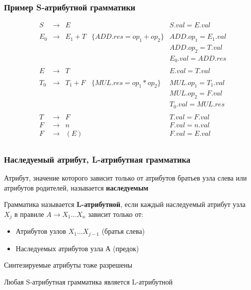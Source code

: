 \documentclass{beamer}
\begin{document}
\begin{frame}[fragile]
  \transwipe[direction=90]
  \frametitle{Пример S-атрибутной грамматики}
$$
\begin{array}{ccclll}
&S  & \rightarrow & E       &                                & S.val = E.val \\~\\

&E_0& \rightarrow & E_1 + T & \{ ADD.res = op_1 + op_2 \} & ADD.op_1 = E_1.val \\
&   &             &         &                                & ADD.op_2 = T.val \\
&   &             &         &                                & E_0.val = ADD.res \\~\\ 

&E  & \rightarrow & T       &                                & E.val = T.val \\~\\

&T_0& \rightarrow & T_1 + F & \{ MUL.res = op_1 * op_2 \} & MUL.op_1 = T_1.val \\
&   &             &         &                                & MUL.op_2 = F.val \\
&   &             &         &                                & T_0.val = MUL.res \\~\\ 

&T  & \rightarrow & F       &                                & T.val = F.val \\
&F  & \rightarrow & n       &                                & F.val = n.val \\
&F  & \rightarrow & (E)     &                                & F.val = E.val \\

\end{array}
$$  
\end{frame}

\begin{frame}[fragile]
  \transwipe[direction=90]
  \frametitle{Наследуемый атрибут, L-атрибутная грамматика}
Атрибут, значение которого зависит только от атрибутов братьев узла слева или атрибутов родителей, называется \textbf{наследуемым}
    
\vfill 

Грамматика называется \textbf{L-атрибутной}, если каждый наследуемый
атрибут узла $X_j$ в правиле $A \to X_1 \dots X_n$ зависит только от: 

\begin{itemize}
  \item Атрибутов узлов $X_1 \dots X_{j-1}$ (братья слева)
  \item Наследуемых атрибутов узла $А$ (предок)
\end{itemize}

\vfill 

Синтезируемые атрибуты тоже разрешены

\vfill 

Любая S-атрибутная грамматика является L-атрибутной
\end{frame}
\end{document}
